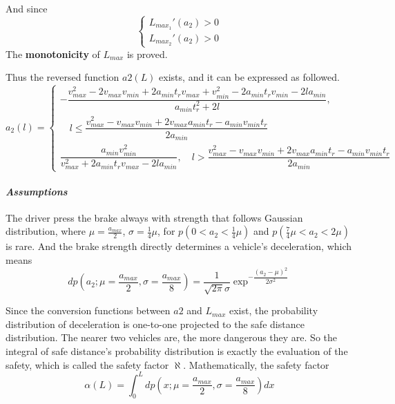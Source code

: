 And since 
\begin{equation}
\left \{
\begin{array}{cl}
L_{max_1}'(a_2) > 0 \\
L_{max_2}'(a_2) > 0
\end{array}
\right .
\end{equation}
The \textbf{monotonicity} of $ L_{max} $ is proved.

Thus the reversed function $ a2(L) $ exists, and it can 
be expressed as followed.
\[ a_2(l) = \begin{cases}
-\dfrac{v_{max}^2 - 2v_{max}v_{min} + 2a_{min}t_rv_{max} + v_{min}^2 - 2a_{min}t_rv_{min} - 2la_{min}}{a_{min}t_r^2 + 2l}, 
\\

\quad l \leq \dfrac{v_{max}^2 - v_{max}v_{min} + 2v_{max}a_{min}t_r - a_{min} v_{min}t_r}{2a_{min}}\\
\dfrac{a_{min}v_{min}^2}{v_{max}^2 + 2a_{min}t_rv_{max} - 2la_{min}}, \quad  l > \dfrac{v_{max}^2 - v_{max}v_{min} + 2v_{max}a_{min}t_r - a_{min} v_{min}t_r}{2a_{min}}
\end{cases}\]

\paragraph{\emph{Assumptions}} The driver press the brake 
always with strength that follows Gaussian distribution, 
where $\mu = \frac{a_{max}}{2}$, $\sigma = \frac{1}{4}\mu$, 
for $p(0 < a_2 < \frac{1}{4} \mu)$ and $p(\frac{7}{4} \mu 
< a_2 < 2\mu)$ is rare. And the brake strength directly 
determines a vehicle's deceleration, which means 
\begin{equation}
dp(a_2;\mu=\dfrac{a_{max}}{2},\sigma=\dfrac{a_{max}}{8})
 = \dfrac{1}{\sqrt{2\pi}\sigma}\exp^{-\dfrac{(a_2-\mu)^2}
{2\sigma^2}}
\end{equation}

Since the conversion functions between $ a2 $ and 
$ L_{max} $ exist, the probability distribution of 
deceleration is one-to-one projected to the safe distance 
distribution. The nearer two vehicles are, the more 
dangerous they are. So the integral of safe distance's 
probability distribution is exactly the evaluation of 
the safety, which is called the safety factor $ \aleph $. 
Mathematically, the safety factor 
\begin{equation}
\alpha(L) = \int_{0}^{L}dp(x;\mu=\dfrac{a_{max}}{2},\sigma=\dfrac
{a_{max}}{8})dx
\end{equation}


